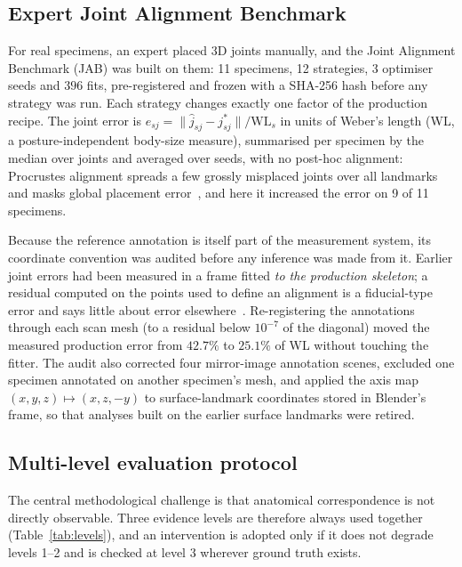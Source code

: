 \subsection{Expert Joint Alignment Benchmark}
\label{sec:jab}

For real specimens, an expert placed 3D joints manually, and the Joint Alignment
Benchmark (JAB) was built on them: 11 specimens, 12 strategies, 3 optimiser seeds
and $396$ fits, pre-registered and frozen with a SHA-256 hash before any strategy
was run. Each strategy changes exactly one factor of the production recipe. The
joint error is $e_{sj}=\|\hat j_{sj}-j^\ast_{sj}\|/\mathrm{WL}_s$ in units of
Weber's length (WL, a posture-independent body-size measure), summarised per
specimen by the median over joints and averaged over seeds, with no post-hoc
alignment: Procrustes alignment spreads a few grossly misplaced joints over all
landmarks and masks global placement error~\cite{vonCramon}, and here it
increased the error on 9 of 11 specimens.

Because the reference annotation is itself part of the measurement system, its
coordinate convention was audited before any inference was made from it. Earlier
joint errors had been measured in a frame fitted \emph{to the production
skeleton}; a residual computed on the points used to define an alignment is a
fiducial-type error and says little about error elsewhere~\cite{fitzpatrick}.
Re-registering the annotations through each scan mesh (to a residual below
$10^{-7}$ of the diagonal) moved the measured production error from $42.7\%$ to
$25.1\%$ of WL without touching the fitter. The audit also corrected four
mirror-image annotation scenes, excluded one specimen annotated on another
specimen's mesh, and applied the axis map $(x,y,z)\mapsto(x,z,-y)$ to
surface-landmark coordinates stored in Blender's frame, so that analyses built on
the earlier surface landmarks were retired.

\subsection{Multi-level evaluation protocol}
\label{sec:protocol}

The central methodological challenge is that anatomical correspondence is not
directly observable. Three evidence levels are therefore always used together
(Table~\ref{tab:levels}), and an intervention is adopted only if it does not
degrade levels 1--2 and is checked at level 3 wherever ground truth exists.

